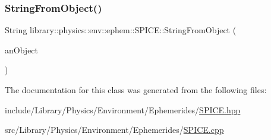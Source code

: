 \mbox{\label{classlibrary_1_1physics_1_1env_1_1ephem_1_1_s_p_i_c_e_aebeefe1b806d93e576a0b08c8d24b250}} 
\subsubsection{\texorpdfstring{String\+From\+Object()}{StringFromObject()}}
{\footnotesize\ttfamily String library\+::physics\+::env\+::ephem\+::\+S\+P\+I\+C\+E\+::\+String\+From\+Object (\begin{DoxyParamCaption}\item[{const \hyperlink{classlibrary_1_1physics_1_1env_1_1ephem_1_1_s_p_i_c_e_a86f1a863677210ba8884807cc725c0f8}{S\+P\+I\+C\+E\+::\+Object} \&}]{an\+Object }\end{DoxyParamCaption})\hspace{0.3cm}{\ttfamily [static]}}



The documentation for this class was generated from the following files\+:\begin{DoxyCompactItemize}
\item 
include/\+Library/\+Physics/\+Environment/\+Ephemerides/\hyperlink{_s_p_i_c_e_8hpp}{S\+P\+I\+C\+E.\+hpp}\item 
src/\+Library/\+Physics/\+Environment/\+Ephemerides/\hyperlink{_s_p_i_c_e_8cpp}{S\+P\+I\+C\+E.\+cpp}\end{DoxyCompactItemize}
